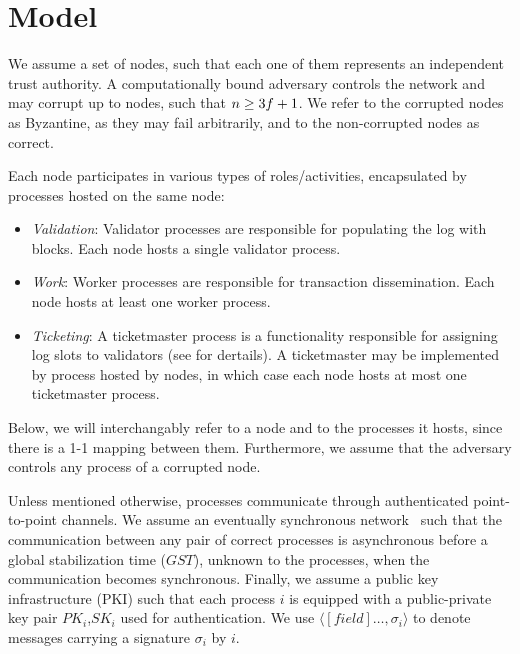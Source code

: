 \section{Model}
\label{sec:perliminaries}
%
We assume a set of \numprocesses nodes, such that each one of them represents an independent trust authority.
A computationally bound adversary controls the network and may corrupt up to \numfaults nodes, such that $n \ge 3f + 1$.
We refer to the corrupted nodes as Byzantine, as they may fail arbitrarily, and to the non-corrupted nodes as correct. 

Each node participates in various types of roles/activities, encapsulated by processes hosted on the same node:
\begin{itemize}
	\item \textit{Validation}: Validator processes are responsible for populating the log with blocks. Each node hosts a single validator process.
	\item \textit{Work}: Worker processes are responsible for transaction dissemination. Each node hosts at least one worker process.
	\item \textit{Ticketing}: A ticketmaster process is a functionality responsible for assigning log slots to validators (see  for dertails). A ticketmaster may be implemented by process hosted by nodes, in which case each node hosts at most one ticketmaster process. 
\end{itemize}
Below, we will interchangably refer to a node and to the processes it hosts, since there is a 1-1 mapping between them.
Furthermore, we assume that the adversary controls any process of a corrupted node.

Unless mentioned otherwise, processes communicate through authenticated point-to-point channels.
We assume an eventually synchronous network~\cite{DworkLS88}
such that the communication between any pair of correct processes is asynchronous before a global stabilization time ($GST$), unknown to the processes, 
when the communication becomes synchronous.
Finally, we assume a public key infrastructure (PKI) such that each process $i$ is equipped with a public-private key pair $PK_i$,$SK_i$ used for authentication.
We use $\langle \mathit{[field]}\ldots, \sigma_i\rangle$ to denote messages carrying a signature $\sigma_i$ by $i$.